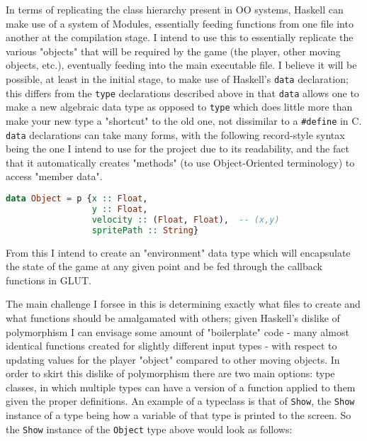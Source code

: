 \documentclass[12pt, a4paper]{report}
\begin{document}
\par

In terms of replicating the class hierarchy present in OO systems, Haskell can make use of a system of Modules, essentially feeding functions from one file into another at the compilation stage.
I intend to use this to essentially replicate the various "objects" that will be required by the game (the player, other moving objects, etc.), eventually feeding into the main executable file.
I believe it will be possible, at least in the initial stage, to make use of Haskell's \verb|data| declaration; this differs from the \verb|type| declarations described above in that \verb|data| allows one to make a new algebraic data type as opposed to \verb|type| which does little more than make your new type a "shortcut" to the old one, not dissimilar to a \verb|#define| in C.
\verb|data| declarations can take many forms, with the following record-style syntax being the one I intend to use for the project due to its readability, and the fact that it automatically creates "methods" (to use Object-Oriented terminology) to access "member data".

\begin{lstlisting}[language=Haskell]
data Object = p {x :: Float,
                 y :: Float,
                 velocity :: (Float, Float),  -- (x,y)
                 spritePath :: String}
\end{lstlisting}

From this I intend to create an "environment" data type which will encapsulate the state of the game at any given point and be fed through the callback functions in GLUT.

\par

The main challenge I forsee in this is determining exactly what files to create and what functions should be amalgamated with others; given Haskell's dislike of polymorphism I can envisage some amount of "boilerplate" code - many almost identical functions created for slightly different input types - with respect to updating values for the player "object" compared to other moving objects.
In order to skirt this dislike of polymorphism there are two main options: type classes, in which multiple types can have a version of a function applied to them given the proper definitions.
An example of a typeclass is that of \verb|Show|, the \verb|Show| instance of a type being how a variable of that type is printed to the screen.
So the \verb|Show| instance of the \verb|Object| type above would look as follows:
\end{document}
